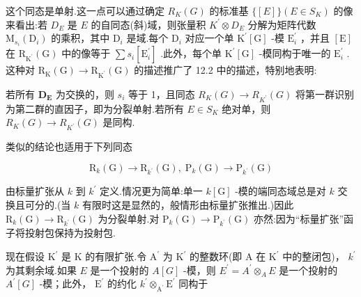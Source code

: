 \documentclass[10pt]{article}
\begin{document}
这个同态是单射.这一点可以通过确定 \({R}_{K}\left( G\right)\) 的标准基 \(\{ \left\lbrack  E\right\rbrack  \} \left( {E \in  {S}_{K}}\right)\) 的像来看出:若 \({D}_{E}\) 是 \(E\) 的自同态(斜)域，则张量积 \({K}^{\prime } \otimes  {D}_{E}\) 分解为矩阵代数 \({\mathrm{M}}_{{s}_{i}}\left( {\mathrm{D}}_{i}\right)\) 的乘积，其中 \({\mathrm{D}}_{i}\) 是域.每个 \({\mathrm{D}}_{i}\) 对应一个单 \({\mathrm{K}}^{\prime }\left\lbrack  \mathrm{G}\right\rbrack\) -模 \({\mathrm{E}}_{i}^{\prime }\) ，并且 \(\left\lbrack  \mathrm{E}\right\rbrack\) 在 \({\mathrm{R}}_{{\mathrm{K}}^{\prime }}\left( \mathrm{G}\right)\) 中的像等于 \(\sum {s}_{i}\left\lbrack  {\mathrm{E}}_{i}^{\prime }\right\rbrack\) .此外，每个单 \({\mathrm{K}}^{\prime }\left\lbrack  \mathrm{G}\right\rbrack\) -模同构于唯一的 \({\mathrm{E}}_{i}^{\prime }\) .这种对 \({\mathrm{R}}_{\mathrm{K}}\left( \mathrm{G}\right)  \rightarrow  {\mathrm{R}}_{{\mathrm{K}}^{\prime }}\left( \mathrm{G}\right)\) 的描述推广了 12.2 中的描述，特别地表明:

若所有 \({\mathbf{D}}_{\mathbf{E}}\) 为交换的，则 \({s}_{i}\) 等于 1，且同态 \({R}_{K}\left( G\right)  \rightarrow  {R}_{{K}^{\prime }}\left( G\right)\) 将第一群识别为第二群的直因子，即为分裂单射.若所有 \(E \in  {S}_{K}\) 绝对单，则 \({R}_{K}\left( G\right)  \rightarrow  {R}_{{K}^{\prime }}\left( G\right)\) 是同构.

类似的结论也适用于下列同态

\[
{\mathrm{R}}_{k}\left( \mathrm{G}\right)  \rightarrow  {\mathrm{R}}_{{k}^{\prime }}\left( \mathrm{G}\right) ,\;{\mathrm{P}}_{k}\left( \mathrm{G}\right)  \rightarrow  {\mathrm{P}}_{{k}^{\prime }}\left( \mathrm{G}\right)
\]

由标量扩张从 \(k\) 到 \({k}^{\prime }\) 定义.情况更为简单:单一 \(k\left\lbrack  \mathrm{G}\right\rbrack\) -模的端同态域总是对 \(k\) 交换且可分的.(当 \(k\) 有限时这是显然的，般情形由标量扩张推出.)因此 \({\mathrm{R}}_{k}\left( \mathrm{G}\right)  \rightarrow  {\mathrm{R}}_{{k}^{\prime }}\left( \mathrm{G}\right)\) 为分裂单射.对 \({\mathrm{P}}_{k}\left( \mathrm{G}\right)  \rightarrow  {\mathrm{P}}_{{k}^{\prime }}\left( \mathrm{G}\right)\) 亦然:因为“标量扩张”函子将投射包保持为投射包.

现在假设 \({\mathrm{K}}^{\prime }\) 是 \(\mathrm{K}\) 的有限扩张.令 \({\mathrm{A}}^{\prime }\) 为 \({\mathrm{K}}^{\prime }\) 的整数环(即 \(\mathrm{A}\) 在 \({\mathrm{K}}^{\prime }\) 中的整闭包)， \({k}^{\prime }\) 为其剩余域.如果 \(E\) 是一个投射的 \(A\left\lbrack  G\right\rbrack\) -模，则 \({E}^{\prime } = {A}^{\prime }{ \otimes  }_{A}E\) 是一个投射的 \({A}^{\prime }\left\lbrack  G\right\rbrack\) -模；此外， \({\mathrm{E}}^{\prime }\) 的约化 \({k}^{\prime }{ \otimes  }_{{\mathrm{A}}^{\prime }}{\mathrm{E}}^{\prime }\) 同构于
\end{document}
